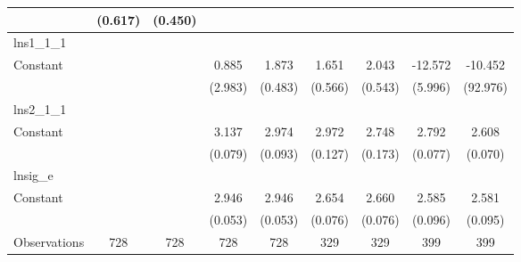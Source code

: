 \begin{table}[htbp]
\begin{tabular}{l*{8}{c}}
                    &     (0.617)         &     (0.450)         &                     &                     &                     &                     &                     &                     \\
\hline
lns1\_1\_1            &                     &                     &                     &                     &                     &                     &                     &                     \\
Constant            &                     &                     &       0.885         &       1.873\sym{***}&       1.651\sym{**} &       2.043\sym{***}&     -12.572\sym{*}  &     -10.452         \\
                    &                     &                     &     (2.983)         &     (0.483)         &     (0.566)         &     (0.543)         &     (5.996)         &    (92.976)         \\
\hline
lns2\_1\_1            &                     &                     &                     &                     &                     &                     &                     &                     \\
Constant            &                     &                     &       3.137\sym{***}&       2.974\sym{***}&       2.972\sym{***}&       2.748\sym{***}&       2.792\sym{***}&       2.608\sym{***}\\
                    &                     &                     &     (0.079)         &     (0.093)         &     (0.127)         &     (0.173)         &     (0.077)         &     (0.070)         \\
\hline
lnsig\_e             &                     &                     &                     &                     &                     &                     &                     &                     \\
Constant            &                     &                     &       2.946\sym{***}&       2.946\sym{***}&       2.654\sym{***}&       2.660\sym{***}&       2.585\sym{***}&       2.581\sym{***}\\
                    &                     &                     &     (0.053)         &     (0.053)         &     (0.076)         &     (0.076)         &     (0.096)         &     (0.095)         \\
\hline
Observations        &         728         &         728         &         728         &         728         &         329         &         329         &         399         &         399         \\
\hline\hline
\end{tabular}
\end{table}
